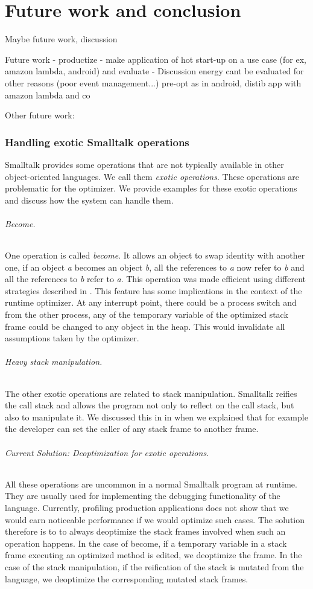 \documentclass[a4paper,12pt,twoside]{../includes/ThesisStyle}
\begin{document}
\fi

\chapter{Future work and conclusion}
\label{chap:conclusion}
\minitoc

Maybe future work, discussion

Future work
- productize
- make application of hot start-up on a use case (for ex, amazon lambda, android) and evaluate
- Discussion energy cant be evaluated for other reasons (poor event management...) pre-opt as in android, distib app with amazon lambda and co

Other future work:


\subsection{Handling exotic Smalltalk operations}

Smalltalk provides some operations that are not typically available in other object-oriented languages.  We call them \emph{exotic operations}. These operations are problematic for the optimizer. We provide examples for
these exotic operations and discuss how the system can handle them.

\subparagraph{Become.} One operation is called \emph{become}. It allows an object to swap identity with another one, \ie if an object \emph{a} becomes an object \emph{b}, all the references to \emph{a} now refer to \emph{b} and all the references to \emph{b} refer to \emph{a}. This operation was made efficient using different strategies described in \cite{Mir15a}. This feature has some implications in the context of the runtime optimizer. At any interrupt point, there could be a process switch and from the other process, any of the temporary variable of the optimized stack frame could be changed to any object in the heap. This would invalidate all assumptions taken by the optimizer.

\subparagraph{Heavy stack manipulation.} The other exotic operations are related to stack manipulation. Smalltalk reifies the call stack and allows the program not only to reflect on the call stack, but also to manipulate it. We discussed this in in  when we explained that for example the developer can set the caller of any stack frame to another frame.

\subparagraph{Current Solution: Deoptimization for exotic operations.} All these operations are uncommon in a normal Smalltalk program at runtime.  They are usually used for implementing the debugging functionality of the language. Currently, profiling production applications does not show that we would earn noticeable performance if we would optimize such cases. The solution therefore is to to always deoptimize the stack frames involved when such an operation happens. In the case of become, if a temporary variable in a stack frame executing an optimized method is edited, we deoptimize the frame. In the case of the stack manipulation, if the reification of the stack is mutated from the language, we deoptimize the corresponding mutated stack frames.
\end{document}
